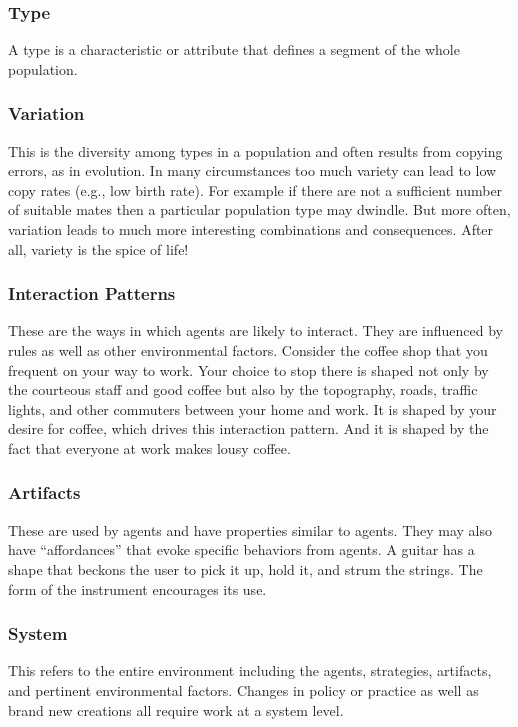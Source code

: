 \documentclass[jou,apacite]{apa6}
\begin{document}
\subsubsection{Type}
A type is a characteristic or attribute that defines a segment of the whole population.

\subsubsection{Variation}
This is the diversity among types in a population and often results from copying errors, as in evolution.  In many circumstances too much variety can lead to low copy rates (e.g., low birth rate).  For example if there are not a sufficient number of suitable mates then a particular population type may dwindle.  But more often, variation leads to much more interesting combinations and consequences.  After all, variety is the spice of life!

\subsubsection{Interaction Patterns}
These are the ways in which agents are likely to interact.  They are influenced by rules as well as other environmental factors.  Consider the coffee shop that you frequent on your way to work.  Your choice to stop there is shaped not only by the courteous staff and good coffee but also by the topography, roads, traffic lights, and other commuters between your home and work.  It is shaped by your desire for coffee, which drives this interaction pattern. And it is shaped by the fact that
everyone at work makes lousy coffee.

\subsubsection{Artifacts}
These are used by agents and have properties similar to agents.  They may also have ``affordances'' that evoke specific behaviors from agents. A guitar has a shape that beckons the user to pick it up, hold it, and strum the strings.  The form of the instrument encourages its use.

\subsubsection{System}
This refers to the entire environment including the agents, strategies, artifacts, and pertinent environmental factors.  Changes in policy or practice as well as brand new creations all require work at a system level.
\end{document}
